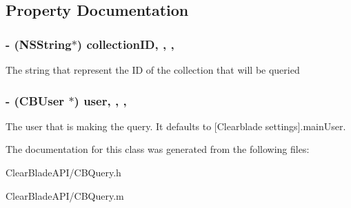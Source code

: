 \subsection{Property Documentation}
\hypertarget{interface_c_b_query_ad7e594dc30699c9dbae407e55b588b00}{
\subsubsection[{collection\+I\+D}]{\setlength{\rightskip}{0pt plus 5cm}-\/ (N\+S\+String$\ast$) collection\+I\+D\hspace{0.3cm}{\ttfamily [read]}, {\ttfamily [write]}, {\ttfamily [nonatomic]}, {\ttfamily [strong]}}}\label{interface_c_b_query_ad7e594dc30699c9dbae407e55b588b00}
The string that represent the I\+D of the collection that will be queried \hypertarget{interface_c_b_query_af5679b48acc1313cab6dd83e2777b440}{
\subsubsection[{user}]{\setlength{\rightskip}{0pt plus 5cm}-\/ ({\bf C\+B\+User} $\ast$) user\hspace{0.3cm}{\ttfamily [read]}, {\ttfamily [write]}, {\ttfamily [nonatomic]}, {\ttfamily [strong]}}}\label{interface_c_b_query_af5679b48acc1313cab6dd83e2777b440}
The user that is making the query. It defaults to \mbox{[}Clearblade settings\mbox{]}.main\+User. 

The documentation for this class was generated from the following files\+:\begin{DoxyCompactItemize}
\item 
Clear\+Blade\+A\+P\+I/C\+B\+Query.\+h\item 
Clear\+Blade\+A\+P\+I/C\+B\+Query.\+m\end{DoxyCompactItemize}
